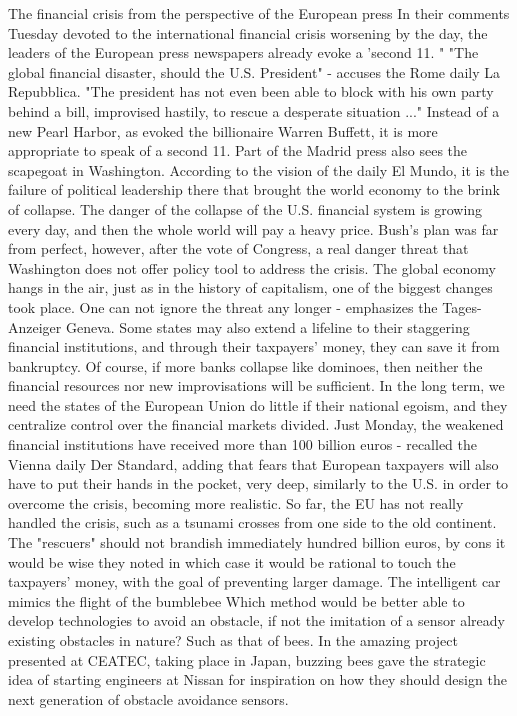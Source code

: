The financial crisis from the perspective of the European press
In their comments Tuesday devoted to the international financial crisis worsening by the day, the leaders of the European press newspapers already evoke a 'second 11. "
"The global financial disaster, should the U.S. President" - accuses the Rome daily La Repubblica. "The president has not even been able to block with his own party behind a bill, improvised hastily, to rescue a desperate situation ..."
Instead of a new Pearl Harbor, as evoked the billionaire Warren Buffett, it is more appropriate to speak of a second 11.
Part of the Madrid press also sees the scapegoat in Washington.
According to the vision of the daily El Mundo, it is the failure of political leadership there that brought the world economy to the brink of collapse.
The danger of the collapse of the U.S. financial system is growing every day, and then the whole world will pay a heavy price.
Bush's plan was far from perfect, however, after the vote of Congress, a real danger threat that Washington does not offer policy tool to address the crisis.
The global economy hangs in the air, just as in the history of capitalism, one of the biggest changes took place.
One can not ignore the threat any longer - emphasizes the Tages-Anzeiger Geneva.
Some states may also extend a lifeline to their staggering financial institutions, and through their taxpayers' money, they can save it from bankruptcy.
Of course, if more banks collapse like dominoes, then neither the financial resources nor new improvisations will be sufficient.
In the long term, we need the states of the European Union do little if their national egoism, and they centralize control over the financial markets divided.
Just Monday, the weakened financial institutions have received more than 100 billion euros - recalled the Vienna daily Der Standard, adding that fears that European taxpayers will also have to put their hands in the pocket, very deep, similarly to the U.S. in order to overcome the crisis, becoming more realistic.
So far, the EU has not really handled the crisis, such as a tsunami crosses from one side to the old continent.
The "rescuers" should not brandish immediately hundred billion euros, by cons it would be wise they noted in which case it would be rational to touch the taxpayers' money, with the goal of preventing larger damage.
The intelligent car mimics the flight of the bumblebee
Which method would be better able to develop technologies to avoid an obstacle, if not the imitation of a sensor already existing obstacles in nature?
Such as that of bees.
In the amazing project presented at CEATEC, taking place in Japan, buzzing bees gave the strategic idea of ​​starting engineers at Nissan for inspiration on how they should design the next generation of obstacle avoidance sensors.
